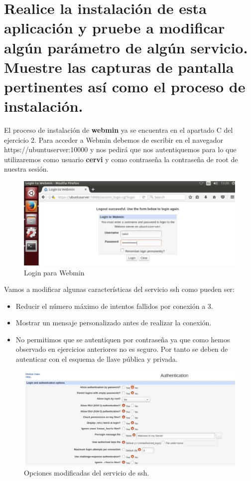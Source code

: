 \section{Realice la instalación de esta aplicación y pruebe a modificar algún parámetro de algún servicio. Muestre las capturas de pantalla pertinentes así como el proceso de instalación.}
El proceso de instalación de \textbf{webmin} ya se encuentra en el apartado C del ejercicio 2.
Para acceder a Webmin debemos de escribir en el navegador https://ubuntuserver:10000 y nos pedirá que nos autentiquemos para lo que utilizaremos como usuario \textbf{cervi} y como contraseña la contraseña de root de nuestra sesión.
	\begin{figure}[H]
	\centering
	\includegraphics[scale=0.6]{webmin-login.jpg}
	\caption{Login para Webmin \label{fig:figura21}}
\end{figure}

Vamos a modificar algunas características del servicio ssh como pueden ser:
\begin{itemize}
	\item Reducir el número máximo de intentos fallidos por conexión a 3.
	\item Mostrar un mensaje personalizado antes de realizar la conexión.
	\item No permitimos que se autentiquen por contraseña ya que como hemos observado en ejercicios anteriores no es seguro. Por tanto se deben de autenticar con el esquema de llave pública y privada.
\end{itemize}
\begin{figure}[H]
	\centering
	\includegraphics[scale=0.6]{webmin-change.jpg}
	\caption{Opciones modificadas del servicio de ssh. \label{fig:figura28}}
\end{figure}
